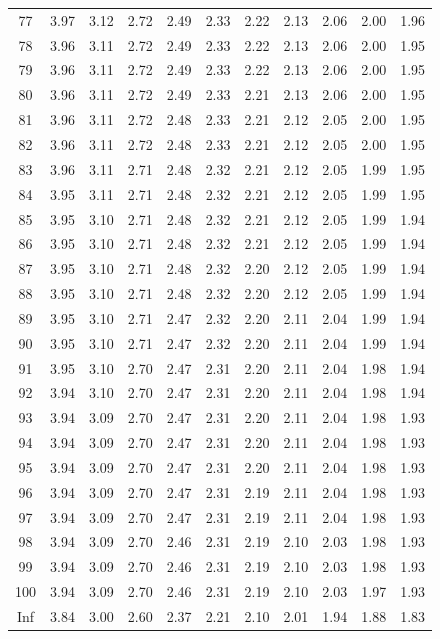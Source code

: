\documentclass[
]{book}
\theoremstyle{definition}
\theoremstyle{definition}
\theoremstyle{definition}
\theoremstyle{definition}
\theoremstyle{remark}
\begin{document}
\begin{longtable}[]{@{}ccccccccccc@{}}
77 & 3.97 & 3.12 & 2.72 & 2.49 & 2.33 & 2.22 & 2.13 & 2.06 & 2.00 & 1.96 \\
78 & 3.96 & 3.11 & 2.72 & 2.49 & 2.33 & 2.22 & 2.13 & 2.06 & 2.00 & 1.95 \\
79 & 3.96 & 3.11 & 2.72 & 2.49 & 2.33 & 2.22 & 2.13 & 2.06 & 2.00 & 1.95 \\
80 & 3.96 & 3.11 & 2.72 & 2.49 & 2.33 & 2.21 & 2.13 & 2.06 & 2.00 & 1.95 \\
81 & 3.96 & 3.11 & 2.72 & 2.48 & 2.33 & 2.21 & 2.12 & 2.05 & 2.00 & 1.95 \\
82 & 3.96 & 3.11 & 2.72 & 2.48 & 2.33 & 2.21 & 2.12 & 2.05 & 2.00 & 1.95 \\
83 & 3.96 & 3.11 & 2.71 & 2.48 & 2.32 & 2.21 & 2.12 & 2.05 & 1.99 & 1.95 \\
84 & 3.95 & 3.11 & 2.71 & 2.48 & 2.32 & 2.21 & 2.12 & 2.05 & 1.99 & 1.95 \\
85 & 3.95 & 3.10 & 2.71 & 2.48 & 2.32 & 2.21 & 2.12 & 2.05 & 1.99 & 1.94 \\
86 & 3.95 & 3.10 & 2.71 & 2.48 & 2.32 & 2.21 & 2.12 & 2.05 & 1.99 & 1.94 \\
87 & 3.95 & 3.10 & 2.71 & 2.48 & 2.32 & 2.20 & 2.12 & 2.05 & 1.99 & 1.94 \\
88 & 3.95 & 3.10 & 2.71 & 2.48 & 2.32 & 2.20 & 2.12 & 2.05 & 1.99 & 1.94 \\
89 & 3.95 & 3.10 & 2.71 & 2.47 & 2.32 & 2.20 & 2.11 & 2.04 & 1.99 & 1.94 \\
90 & 3.95 & 3.10 & 2.71 & 2.47 & 2.32 & 2.20 & 2.11 & 2.04 & 1.99 & 1.94 \\
91 & 3.95 & 3.10 & 2.70 & 2.47 & 2.31 & 2.20 & 2.11 & 2.04 & 1.98 & 1.94 \\
92 & 3.94 & 3.10 & 2.70 & 2.47 & 2.31 & 2.20 & 2.11 & 2.04 & 1.98 & 1.94 \\
93 & 3.94 & 3.09 & 2.70 & 2.47 & 2.31 & 2.20 & 2.11 & 2.04 & 1.98 & 1.93 \\
94 & 3.94 & 3.09 & 2.70 & 2.47 & 2.31 & 2.20 & 2.11 & 2.04 & 1.98 & 1.93 \\
95 & 3.94 & 3.09 & 2.70 & 2.47 & 2.31 & 2.20 & 2.11 & 2.04 & 1.98 & 1.93 \\
96 & 3.94 & 3.09 & 2.70 & 2.47 & 2.31 & 2.19 & 2.11 & 2.04 & 1.98 & 1.93 \\
97 & 3.94 & 3.09 & 2.70 & 2.47 & 2.31 & 2.19 & 2.11 & 2.04 & 1.98 & 1.93 \\
98 & 3.94 & 3.09 & 2.70 & 2.46 & 2.31 & 2.19 & 2.10 & 2.03 & 1.98 & 1.93 \\
99 & 3.94 & 3.09 & 2.70 & 2.46 & 2.31 & 2.19 & 2.10 & 2.03 & 1.98 & 1.93 \\
100 & 3.94 & 3.09 & 2.70 & 2.46 & 2.31 & 2.19 & 2.10 & 2.03 & 1.97 & 1.93 \\
Inf & 3.84 & 3.00 & 2.60 & 2.37 & 2.21 & 2.10 & 2.01 & 1.94 & 1.88 & 1.83 \\
\bottomrule()
\end{longtable}
\end{document}
